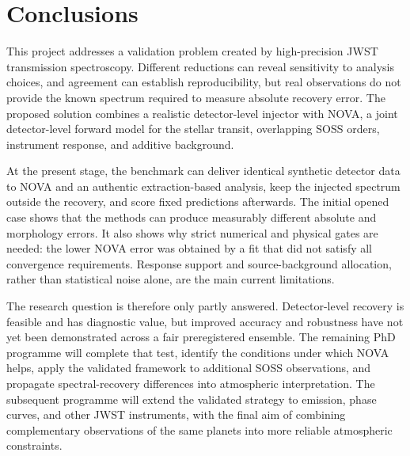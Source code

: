 \section{Conclusions}
\label{sec:conclusions}

This project addresses a validation problem created by high-precision JWST
transmission spectroscopy. Different reductions can reveal sensitivity to
analysis choices, and agreement can establish reproducibility, but real
observations do not provide the known spectrum required to measure absolute
recovery error. The proposed solution combines a realistic detector-level
injector with NOVA, a joint detector-level forward model for the stellar transit,
overlapping SOSS orders, instrument response, and additive background.

At the present stage, the benchmark can deliver identical synthetic detector data
to NOVA and an authentic extraction-based analysis, keep the injected spectrum
outside the recovery, and score fixed predictions afterwards. The initial opened
case shows that the methods can produce measurably different absolute and
morphology errors. It also shows why strict numerical and physical gates are
needed: the lower NOVA error was obtained by a fit that did not satisfy all
convergence requirements. Response support and source-background allocation,
rather than statistical noise alone, are the main current limitations.

The research question is therefore only partly answered. Detector-level recovery
is feasible and has diagnostic value, but improved accuracy and robustness have
not yet been demonstrated across a fair preregistered ensemble. The remaining PhD
programme will complete that test, identify the conditions under which NOVA helps,
apply the validated framework to additional SOSS observations, and propagate
spectral-recovery differences into atmospheric interpretation. The subsequent
programme will extend the validated strategy to emission, phase curves, and
other JWST instruments, with the final aim of combining complementary
observations of the same planets into more reliable atmospheric constraints.
